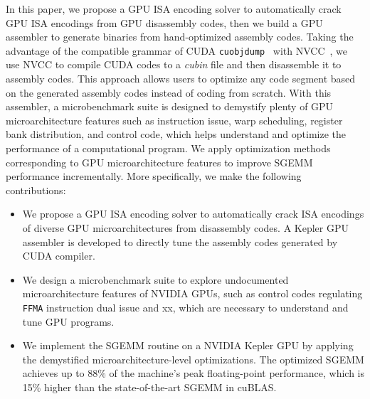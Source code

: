 In this paper, we propose a GPU ISA encoding solver to automatically crack GPU ISA encodings from GPU disassembly codes,
then we build a GPU assembler to generate binaries from hand-optimized assembly codes.%
Taking the advantage of the compatible grammar of CUDA {\tt cuobjdump}~\cite{cubin2015util} with NVCC~\cite{nvcc}, we use NVCC to compile CUDA codes to a {\em cubin} file and 
then disassemble it to assembly codes. 
This approach allows users to optimize any code segment based on the generated assembly codes instead of coding from scratch. 
With this assembler, a microbenchmark suite is designed to 
demystify plenty of GPU microarchitecture features such as instruction issue, warp scheduling, register bank distribution, and control code, which helps understand and optimize the performance of a computational program. 
We apply optimization methods corresponding to GPU microarchitecture features to improve SGEMM performance incrementally. 
More specifically, we make the following contributions:
\begin{itemize}
\item We propose a GPU ISA encoding solver to automatically crack ISA encodings
     of diverse GPU microarchitectures from disassembly codes.
A Kepler GPU assembler is developed to directly tune the assembly codes generated by CUDA compiler.
\item We design a microbenchmark suite to explore undocumented microarchitecture features of NVIDIA GPUs, such as control codes regulating {\tt FFMA} instruction dual issue and xx, which are necessary to understand and tune GPU programs.
\item We implement the SGEMM routine on a NVIDIA Kepler GPU by applying the demystified microarchitecture-level optimizations. 
The optimized SGEMM achieves up to 88\% of the machine's peak floating-point performance, which is 15\% higher than the state-of-the-art SGEMM in cuBLAS.
\end{itemize}

